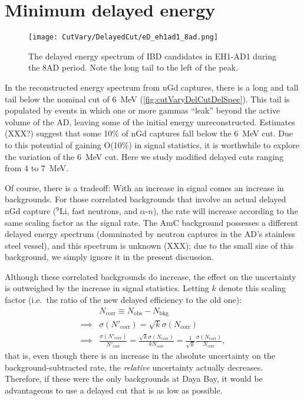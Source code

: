 \documentclass[../thesis.tex]{subfiles}
\begin{document}
\section{Minimum delayed energy}
\label{sec:cutVaryMinDelayed}

\begin{figure}[ht]
  \texttt{[image: CutVary/DelayedCut/eD\_eh1ad1\_8ad.png]}
  \caption{The delayed energy spectrum of IBD candidates in EH1-AD1 during the 8AD period. Note the long tail to the left of the peak.}
  \label{fig:cutVaryDelCutDelSpec}
\end{figure}

In the reconstructed energy spectrum from nGd captures, there is a long and tall tail below the nominal cut of 6~MeV (\autoref{fig:cutVaryDelCutDelSpec}). This tail is populated by events in which one or more gammas ``leak'' beyond the active volume of the AD, leaving some of the initial energy unreconstructed. Estimates (XXX?) suggest that some 10\% of nGd captures fall below the 6~MeV cut. Due to this potential of gaining O(10\%) in signal statistics, it is worthwhile to explore the variation of the 6~MeV cut. Here we study modified delayed cuts ranging from 4 to 7~MeV.

Of course, there is a tradeoff: With an increase in signal comes an increase in backgrounds. For those correlated backgrounds that involve an actual delayed nGd capture ($^9$Li, fast neutrons, and $\alpha$-$n$), the rate will increase according to the same scaling factor as the signal rate. The AmC background possesses a different delayed energy spectrum (domninated by neutron captures in the AD's stainless steel vessel), and this spectrum is unknown (XXX); due to the small size of this background, we simply ignore it in the present discussion.

Although these correlated backgrounds do increase, the effect on the uncertainty is outweighed by the increase in signal statistics. Letting $k$ denote this scaling factor (i.e.\ the ratio of the new delayed efficiency to the old one):
\begin{align}
  \label{eq:cutVaryDelayedNcorrSigma}
  & N_{\mathrm{corr}} \equiv N_{\mathrm{obs}} - N_{\mathrm{bkg}} \\
  \implies & \sigma(N'_{\mathrm{corr}}) = \sqrt{k} \sigma(N_{\mathrm{corr}}) \\
  \implies & \frac{\sigma(N'_{\mathrm{corr}})}{N'_{\mathrm{corr}}} = \frac{\sqrt{k} \sigma(N_{\mathrm{corr}})}{k N_{\mathrm{corr}}} = \frac{1}{\sqrt{k}} \frac{\sigma(N_{\mathrm{corr}})}{N_{\mathrm{corr}}},
\end{align}
that is, even though there is an increase in the absolute uncertainty on the background-subtracted rate, the \emph{relative} uncertainty actually decreases. Therefore, if these were the only backgrounds at Daya Bay, it would be advantageous to use a delayed cut that is as low as possible.
\end{document}
